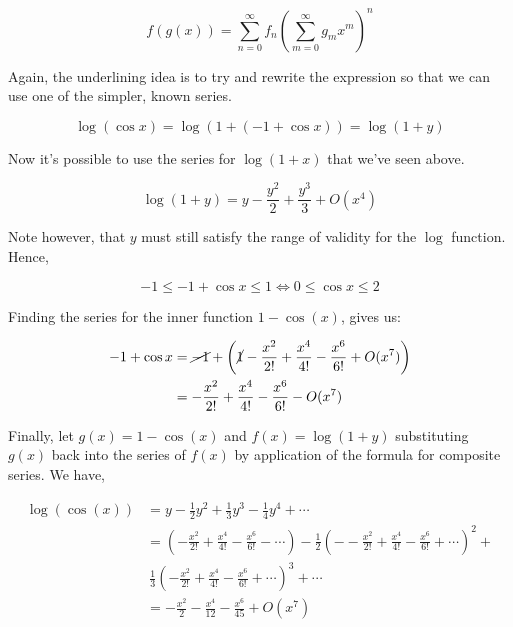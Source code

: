 \documentclass[english,course]{Notes}
\begin{document}
\begin{enumerate}
	$$f ( g ( x ) ) = \sum _ { n = 0 } ^ { \infty } f _ { n } \left( \sum _ { m = 0 } ^ { \infty } g _ { m } x ^ { m } \right) ^ { n }$$
	
	
	\par{Again, the underlining idea is to try and rewrite the expression so that we can use one of the simpler, known series.}
	
	$$ \log ( \cos x ) = \log \left( 1 + \boxed{( - 1 + \cos x )} \right) = \log ( 1 + y ) $$
	
	\par{Now it's possible to use the series for $ \log(1+x)$ that we've seen above.}
	
	$$ \log ( 1 + y ) = y - \frac{y^2}{2} + \frac{y^3}{3} + O(x^4) $$
	
	\par{ Note however, that $y$ must still satisfy the range of validity for the $\log$ function. Hence,}
	
	$$- 1 \leqslant - 1 + \cos x \leqslant 1 \iff 0 \leqslant \cos x \leqslant 2 $$
	
	\par{Finding the series for the inner function $1-\cos(x)$, gives us:}
	
	$$\begin{aligned} - 1 + \cos x & = \cancel{- 1} +  \left( \cancel{1} - \frac { x ^ { 2 } } { 2 ! } + \frac { x ^ { 4 } } { 4 ! } - \frac { x ^ { 6 } } { 6 ! } + O(x^7) \right) \\ & = - \frac { x ^ { 2 } } { 2 ! } + \frac { x ^ { 4 } } { 4 ! } - \frac { x ^ { 6 } } { 6 ! } - O(x^7) \end{aligned}$$
	
	\par{Finally, let $g(x) = 1- \cos(x)$ and $f(x) = \log(1+y)$ substituting $g(x)$ back into the series of $f(x)$ by application of the formula for composite series. We have,}
	
	$$\begin{aligned}
		\log\left(\cos(x)\right) &= y - \frac { 1 } { 2 } y ^ { 2 } + \frac { 1 } { 3 } y ^ { 3 } - \frac { 1 } { 4 } y ^ { 4 } + \cdots \\
			&= \left( - \frac { x ^ { 2 } } { 2 ! } + \frac { x ^ { 4 } } { 4 ! } - \frac { x ^ { 6 } } { 6 ! } - \cdots \right) - \frac { 1 } { 2 } \left( - - \frac { x ^ { 2 } } { 2 ! } + \frac { x ^ { 4 } } { 4 ! } - \frac { x ^ { 6 } } { 6 !} + \cdots \right) ^ { 2 } +  \\ & \ \frac { 1 } { 3 } \left( - \frac { x ^ { 2 } } { 2 ! } + \frac { x ^ { 4 } } { 4 ! } - \frac { x ^ { 6 } } { 6 !} + \cdots \right) ^ { 3 } + \cdots \\
			&= - \frac { x ^ { 2 } } { 2 } - \frac { x ^ { 4 } } { 12 } - \frac { x ^ { 6 } } { 45 } + O(x^7)
			\end{aligned}$$

\end{enumerate}




\newpage
\nocite{*}
\printbibliography
\end{document}
